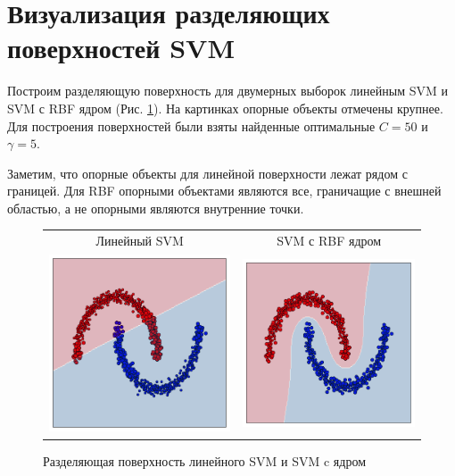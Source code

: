 \documentclass[12pt,fleqn,unicode]{article}
\begin{document}
\section{Визуализация разделяющих поверхностей SVM}

Построим разделяющую поверхность для двумерных выборок линейным SVM и SVM с RBF ядром (Рис. \ref{fig5}).
На картинках опорные объекты отмечены крупнее. Для построения поверхностей были взяты найденные 
оптимальные $C = 50$ и $\gamma = 5$.

Заметим, что опорные объекты для линейной поверхности лежат рядом с границей. Для RBF опорными объектами
являются все, граничащие с внешней областью, а не опорными являются внутренние точки. 

\pagebreak

\begin{figure}[h!]
\centering
\caption{Разделяющая поверхность линейного SVM и SVM c ядром}
\label{fig5}
\begin{tabular}{cc}
	Линейный SVM & SVM с RBF ядром \\
	\includegraphics[width=8cm]{../pict/moon_lin.pdf} & 
	\includegraphics[width=8cm]{../pict/moon_rbf.pdf}

\end{tabular}
\end{figure}
\end{document}
